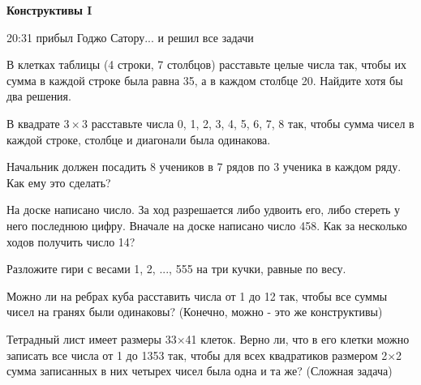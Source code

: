 \centerline{\bf \Huge Конструктивы I}


\begin{flushright}
        \scriptsize{20:31 прибыл Годжо Сатору... и решил все задачи}
\end{flushright}

 В клетках таблицы (4 строки, 7 столбцов) расставьте целые числа так, чтобы их сумма в каждой строке была равна 35, а в каждом столбце 20. Найдите хотя бы два решения.

 В квадрате $3\times3$ расставьте числа 0, 1, 2, 3, 4, 5, 6, 7, 8 так, чтобы сумма чисел в каждой строке, столбце и диагонали была одинакова.

 Начальник должен посадить 8 учеников в 7 рядов по 3 ученика в каждом ряду. Как ему это сделать?

 На доске написано число. За ход разрешается либо удвоить его, либо стереть у него последнюю цифру. Вначале на доске написано число 458. Как за несколько ходов получить число 14?

 Разложите гири с весами 1, 2, ..., 555 на три кучки, равные по весу.

 Можно ли на ребрах куба расставить числа от 1 до 12 так, чтобы все суммы чисел на гранях были одинаковы? (Конечно, можно - это же конструктивы)

 Тетрадный лист имеет размеры 33×41 клеток. Верно ли, что в его клетки можно записать все числа от 1 до 1353 так, чтобы для всех квадратиков размером 2×2 сумма записанных в них четырех чисел была одна и та же? (Сложная задача)